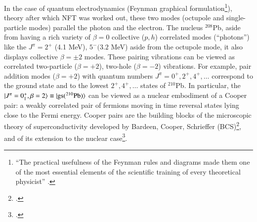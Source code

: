 In the case of quantum electrodynamics (Feynman graphical formulation\footnote{``The practical usefulness of the Feynman rules and diagrams made them one of the most essential elements of the scientific training of every theoretical physicist'' \citep{Mehra:96}.}), theory after which NFT was worked out, these two modes (octupole and single-particle modes) parallel the photon and the electron. The nucleus $^{208}$Pb, aside from having a rich variety of $\beta=0$ collective ($p,h$) correlated modes (``photons'') like the $J^\pi=2^+$ (4.1 MeV), $5^-(3.2$ MeV) aside from the octupole mode, it also displays collective $\beta=\pm2$ modes. These pairing vibrations can be viewed as correlated two-particle ($\beta=+2$), two-hole ($\beta=-2$) vibrations. For example, pair addition modes ($\beta=+2$) with quantum numbers $J^\pi=0^+,2^+,4^+,\dots$ correspond to the ground state and to the lowest $2^+,4^+,\dots$ states of $^{210}$Pb. In particular,  the $|{J^\pi=0^+_1,\beta=2} \rangle\equiv |{\text{gs}(^{210}\text{Pb})} \rangle$ can be viewed as a nuclear embodiment of a Cooper pair: a weakly correlated pair of fermions moving in time reversal states lying close to the Fermi energy. Cooper pairs are the building blocks of the microscopic theory of superconductivity developed by Bardeen, Cooper, Schrieffer (BCS)\footnote{\cite{Bardeen:57a,Bardeen:57b}.}, and of its extension to the nuclear case\footnote{\cite{Bohr:58}.}.


